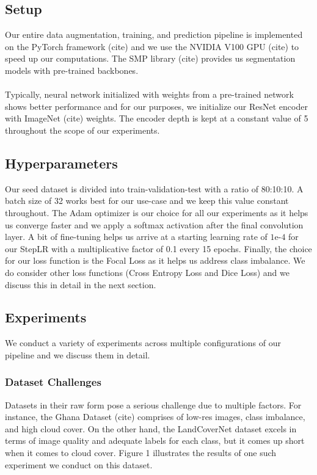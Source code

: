 \documentclass[sigconf, nonacm]{acmart}
\begin{document}
\subsection{Setup}
Our entire data augmentation, training, and prediction pipeline is implemented on the PyTorch framework (cite) and we use the NVIDIA V100 GPU (cite) to speed up our computations. The SMP library (cite) provides us segmentation models with pre-trained backbones. 
\\
\\Typically, neural network initialized with weights from a pre-trained network shows better performance and for our purposes, we initialize our ResNet encoder with ImageNet (cite) weights. The encoder depth is kept at a constant value of 5 throughout the scope of our experiments. 

\subsection{Hyperparameters}
Our seed dataset is divided into train-validation-test with a ratio of 80:10:10. A batch size of 32 works best for our use-case and we keep this value constant throughout. The Adam optimizer is our choice for all our experiments as it helps us converge faster and we apply a softmax activation after the final convolution layer. A bit of fine-tuning helps us arrive at a starting learning rate of $1\text{e-}4$ for our StepLR with a multiplicative factor of 0.1 every 15 epochs. Finally, the choice for our loss function is the Focal Loss as it helps us address class imbalance. We do consider other loss functions (Cross Entropy Loss and Dice Loss) and we discuss this in detail in the next section.
\subsection{Experiments}
We conduct a variety of experiments across multiple configurations of our pipeline and we discuss them in detail.

\subsubsection{Dataset Challenges}
Datasets in their raw form pose a serious challenge due to multiple factors. For instance, the Ghana Dataset (cite) comprises of low-res images, class imbalance, and high cloud cover. On the other hand, the LandCoverNet dataset excels in terms of image quality and adequate labels for each class, but it comes up short when it comes to cloud cover. Figure 1 illustrates the results of one such experiment we conduct on this dataset.
\end{document}
